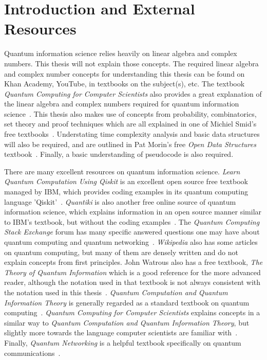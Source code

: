 \section{Introduction and External Resources}
Quantum information science relies heavily on linear algebra and complex numbers. This thesis will not explain those concepts. The required linear algebra and complex number concepts for understanding this thesis can be found on Khan Academy, YouTube, in textbooks on the subject(s), etc. The textbook \emph{Quantum Computing for Computer Scientists} also provides a great explanation of the linear algebra and complex numbers required for quantum information science~\cite{yanofsky2008quantum}. This thesis also makes use of concepts from probability, combinatorics, set theory and proof techniques which are all explained in one of Michiel Smid's free textbooks~\cite{michielSmidTextbook}. Understating time complexity analysis and basic data structures will also be required, and are outlined in Pat Morin's free \emph{Open Data Structures} textbook~\cite{morin2013open}. Finally, a basic understanding of pseudocode is also required.

There are many excellent resources on quantum information science. \emph{Learn Quantum Computation Using Qiskit} is an excellent open source free textbook managed by IBM, which provides coding examples in its quantum computing language 'Qiskit'~\cite{Qiskit-Textbook}. \emph{Quantiki} is also another free online source of quantum information science, which explains information in an open source manner similar to IBM's textbook, but without the coding examples~\cite{QuantikiRef}. The \emph{Quantum Computing Stack Exchange} forum has many specific answered questions one may have about quantum computing and quantum networking~\cite{QuantumComputingStackExchange}. \emph{Wikipedia} also has some articles on quantum computing, but many of them are densely written and do not explain concepts from first principles. John Watrous also has a free textbook, \emph{The Theory of Quantum Information} which is a good reference for the more advanced reader, although the notation used in that textbook is not always consistent with the notation used in this thesis~\cite{watrous2018theory}. \emph{Quantum Computation and Quantum Information Theory} is generally regarded as a standard textbook on quantum computing~\cite{nielsen2002quantum}. \emph{Quantum Computing for Computer Scientists} explains concepts in a similar way to \emph{Quantum Computation and Quantum Information Theory}, but slightly more towards the language computer scientists are familiar with~\cite{yanofsky2008quantum}. Finally, \emph{Quantum Networking} is a helpful textbook specifically on quantum communications~\cite{van2014quantum}.

